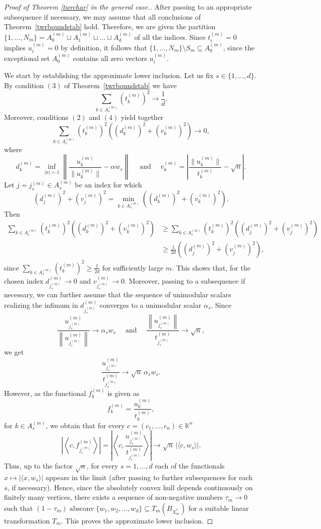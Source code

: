 \documentclass[12pt, reqno]{amsart}
\theoremstyle{definition}
\theoremstyle{remark}
\numberwithin{equation}{section}
\DeclareMathOperator{\absconv}{absconv}
\begin{document}
\begin{proof}[Proof of Theorem \ref{twrchar} in the general case.]
After passing to an appropriate subsequence if necessary, we may assume that all conclusions of Theorem~\ref{twrboundstab} hold. Therefore, we are given the partition  $\{1, \ldots, N_m\} = A^{(m)}_0 \sqcup A^{(m)}_1 \sqcup \ldots \sqcup A^{(m)}_d$ of all the indices. Since $t^{(m)}_i=0$ implies $u^{(m)}_i=0$ by definition, it follows that $\{1, \ldots, N_m\} \setminus S_m \subseteq A^{(m)}_0$, since the exceptional set $A^{(m)}_0$ contains all zero vectors $u^{(m)}_i$. 

We start by establishing the approximate lower inclusion. Let us fix $s \in \{1, \ldots, d\}$. By condition $(3)$ of Theorem~\ref{twrboundstab} we have 
\[ \sum_{k\in A_s^{(m)}} (t_k^{(m)})^2 \to \frac1d. \]
Moreover, conditions $(2)$ and $(4)$ yield together
$$ \sum_{k\in A_s^{(m)}} (t_k^{(m)})^2 \left ( (d_k^{(m)})^2 + (v_k^{(m)})^2 \right ) \to 0,$$
where 
$$d^{(m)}_k = \inf_{|\alpha|=1} \left\| \frac{u_k^{(m)}}{\|u_k^{(m)}\|} -\alpha w_s \right \| \quad \text{ and } \quad v_k^{(m)}= \left | \frac{\|u^{(m)}_k\|}{t^{(m)}_k} - \sqrt{n} \right |.$$ 
Let $j=j_s^{(m)} \in A_s^{(m)}$ be an index for which
$$ (d_j^{(m)})^2 + (v_j^{(m)})^2 = \min_{k \in A_s^{(m)}} \left ( (d_k^{(m)})^2 + (v_k^{(m)})^2 \right ).$$
Then
\begin{align*}
 \sum_{k\in A_s^{(m)}} (t_k^{(m)})^2 \left ( (d_k^{(m)})^2 + (v_k^{(m)})^2 \right ) &\geq  \sum_{k\in A_s^{(m)}} (t_k^{(m)})^2 \left ( (d_j^{(m)})^2 + (v_j^{(m)})^2 \right ) \\
&\geq \frac{1}{2d}\left ( (d_j^{(m)})^2 + (v_j^{(m)})^2 \right ),
\end{align*}
since $\sum_{k\in A_s^{(m)}} (t_k^{(m)})^2 \geq \frac{1}{2d}$ for sufficiently large $m$. This shows that, for the chosen index $d_{j^{(m)}_s}^{(m)} \to 0$ and $v_{j^{(m)}_s}^{(m)} \to 0$. Moreover, passing to a subsequence if necessary, we can further assume that the sequence of unimodular scalars realizing the infimum in $d_{j^{(m)}_s}^{(m)}$ converges to a unimodular scalar $\alpha_s$. Since 
\[\frac{u_{j_s^{(m)}}^{(m)}} {\left \| u_{j_s^{(m)}}^{(m)} \right \|} \to \alpha_sw_s \quad \text{ and } \quad  \frac{\left \|u_{j_s^{(m)}}^{(m)} \right \|}{t_{j_s^{(m)}}^{(m)}} \to \sqrt n, \]
we get 
\[  \frac{u_{j_s^{(m)}}^{(m)}} {t_{j_s^{(m)}}^{(m)}} \to \sqrt n\,\alpha_s w_s.\]
However, as the functional $f^{(m)}_k$ is given as
\[ f_{k}^{(m)} = \frac{u_k^{(m)}}{t_k^{(m)}}, \] 
for $k \in A_s^{(m)}$, we obtain that for every $c=(c_1,\dots,c_n)\in\mathbb K^n$ 
\[\left | \left \langle c, f_{j_s^{(m)}}^{(m)} \right \rangle \right | = \left | \left\langle c, \frac{u_{j_s^{(m)}}^{(m)}} {t_{j_s^{(m)}}^{(m)}} \right\rangle \right | \to  \sqrt n\,|\langle c,w_s\rangle|. \]
Thus, up to the factor $\sqrt n$, for every $s=1,\ldots,d$ each of the functionals $x\mapsto |\langle x,w_s\rangle|$ appears in the limit (after passing to further subsequences for each $s$, if necessary). Hence, since the absolutely convex hull depends continuously on finitely many vertices, there exists a sequence of non-negative numbers $\tau_m \to 0$ such that $(1-\tau_m)\absconv \{w_1, w_2, \ldots, w_d\} \subseteq T_m(B_{X_m^*})$ for a suitable linear transformation $T_m$. This proves the approximate lower inclusion.




\end{proof}
\end{document}

